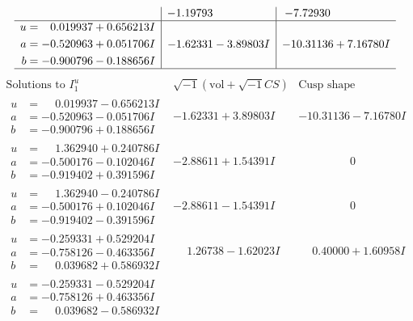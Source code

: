 \documentclass[1p]{elsarticle_modified}
\theoremstyle{definition}
\newcommand{\I}{\sqrt{-1}}
\begin{document}
$$\begin{array}{c|c|c}
 & -1.19793\phantom{ +0.000000I} & -7.72930\phantom{ +0.000000I} \\ \hline\begin{aligned}
u &= \phantom{-}0.019937 + 0.656213 I \\
a &= -0.520963 + 0.051706 I \\
b &= -0.900796 - 0.188656 I\end{aligned}
 & -1.62331 - 3.89803 I & -10.31136 + 7.16780 I\\
 \hline 
 \end{array}$$\newpage$$\begin{array}{c|c|c}  
\text{Solutions to }I^u_{1}& \I (\text{vol} + \sqrt{-1}CS) & \text{Cusp shape}\\
 \hline 
\begin{aligned}
u &= \phantom{-}0.019937 - 0.656213 I \\
a &= -0.520963 - 0.051706 I \\
b &= -0.900796 + 0.188656 I\end{aligned}
 & -1.62331 + 3.89803 I & -10.31136 - 7.16780 I \\ \hline\begin{aligned}
u &= \phantom{-}1.362940 + 0.240786 I \\
a &= -0.500176 - 0.102046 I \\
b &= -0.919402 + 0.391596 I\end{aligned}
 & -2.88611 + 1.54391 I & \phantom{-0.000000 } 0 \\ \hline\begin{aligned}
u &= \phantom{-}1.362940 - 0.240786 I \\
a &= -0.500176 + 0.102046 I \\
b &= -0.919402 - 0.391596 I\end{aligned}
 & -2.88611 - 1.54391 I & \phantom{-0.000000 } 0 \\ \hline\begin{aligned}
u &= -0.259331 + 0.529204 I \\
a &= -0.758126 - 0.463356 I \\
b &= \phantom{-}0.039682 + 0.586932 I\end{aligned}
 & \phantom{-}1.26738 - 1.62023 I & \phantom{-}0.40000 + 1.60958 I \\ \hline\begin{aligned}
u &= -0.259331 - 0.529204 I \\
a &= -0.758126 + 0.463356 I \\
b &= \phantom{-}0.039682 - 0.586932 I\end{aligned}

\end{array}$$
\end{document}
